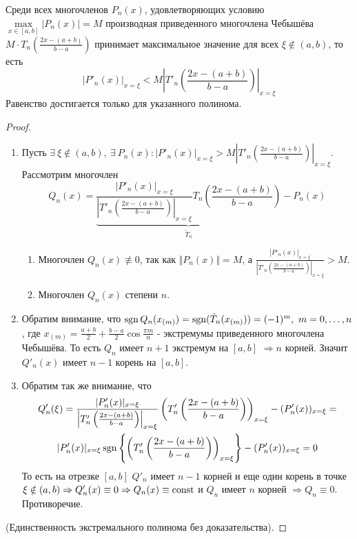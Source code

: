 \begin{theorem}[Марков А.А]
  Среди всех многочленов $P_n(x)$, удовлетворяющих условию $\max\limits_{x\in[a,b]}|P_n(x)|=M$
  производная приведенного многочлена Чебышёва $M\cdot T_n\left(\frac{2x-(a+b)}{b-a}\right)$ принимает максимальное значение
  для всех $\xi\notin(a,b)$, то есть
  \[|P'_n(x)|_{x=\xi}<M\left|T'_n\left(\frac{2x-(a+b)}{b-a}\right)\right|_{x=\xi}\]
  Равенство достигается только для указанного полинома.
\end{theorem}
\begin{proof}
  \begin{enumerate}
    \item Пусть $\exists\ \xi\notin(a,b),\ \exists\ P_n(x): |P'_n(x)|_{x=\xi}>M\left|T'_n\left(\frac{2x-(a+b)}{b-a}\right)\right|_{x=\xi}$. Рассмотрим многочлен
          \[Q_n(x)=\underbrace{\frac{|P'_n(x)|_{x=\xi}}{\left|T'_n\left(\frac{2x-(a+b)}{b-a}\right)\right|_{x=\xi}}T_n\left(\frac{2x-(a+b)}{b-a}\right)}_{\tilde{T}_n} - P_n(x)\]
          \begin{enumerate}
            \item Многочлен $Q_n(x)\not\equiv0$, так как $\Vert P_n(x)\Vert=M$, а $\frac{|P'_n(x)|_{x=\xi}}{\left|T'_n\left(\frac{2x-(a+b)}{b-a}\right)\right|_{x=\xi}}>M$.
            \item Многочлен $Q_n(x)$ степени $n$.
          \end{enumerate}
    \item Обратим внимание, что $\operatorname{sgn} Q_n(x_{(m)})=\operatorname{sgn}(\tilde{T}_n(x_{(m)}))=(-1)^m,\ m=0,\ldots,n$, где $x_{(m)}=\frac{a+b}{2}+\frac{b-a}{2}\cos\frac{\pi m}{n}$
          - экстремумы приведенного многочлена Чебышёва. То есть $Q_n$ имеет $n+1$ экстремум на $[a,b]$ $\Rightarrow n$ корней. Значит $Q'_n(x)$ имеет $n-1$ корень на $[a,b]$.
    \item Обратим так же внимание, что
          \begin{multline*}
            Q'_n(\xi)=\frac{|P'_n(x)|_{x=\xi}}{\left|T'_n\left(\frac{2x-(a+b)}{b-a}\right)\right|_{x=\xi}}\left(T'_n\left(\frac{2x-(a+b)}{b-a}\right)\right)_{x=\xi} - (P'_n(x))_{x=\xi}=\\
            |P'_n(x)|_{x=\xi}\operatorname{sgn}\left\{\left(T'_n\left(\frac{2x-(a+b)}{b-a}\right)\right)_{x=\xi}\right\} - (P'_n(x))_{x=\xi}=0
          \end{multline*}
          То есть на отрезке $[a,b]$
          $Q'_n$ имеет $n-1$ корней и еще один корень
          в точке $\xi\notin(a,b)\Rightarrow Q'_n(x)\equiv0\Rightarrow Q_n(x)\equiv\mathrm{const}$ и $Q_n$ имеет $n$ корней $\Rightarrow Q_n\equiv0$. Противоречие.
  \end{enumerate}
  (Единственность экстремального полинома без доказательства).
\end{proof}
